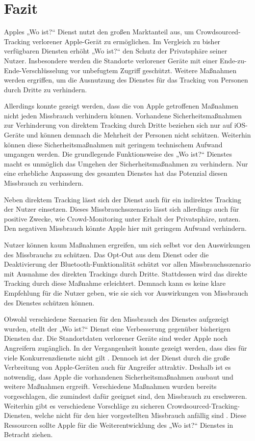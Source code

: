 \section{Fazit}
\label{sec:Fazit}

Apples „Wo ist?“ Dienst nutzt den großen Marktanteil aus, um Crowdsourced-Tracking verlorener Apple-Gerät zu ermöglichen.
Im Vergleich zu bisher verfügbaren Diensten erhöht „Wo ist?“ den Schutz der Privatsphäre seiner Nutzer.
Insbesondere werden die Standorte verlorener Geräte mit einer Ende-zu-Ende-Verschlüsselung vor unbefugtem Zugriff geschützt.
Weitere Maßnahmen werden ergriffen, um die Ausnutzung des Dienstes für das Tracking von Personen durch Dritte zu verhindern.

Allerdings konnte gezeigt werden, dass die von Apple getroffenen Maßnahmen nicht jeden Missbrauch verhindern können.
Vorhandene Sicherheitsmaßnahmen zur Verhinderung von direktem Tracking durch Dritte beziehen sich nur auf iOS-Geräte und können demnach die Mehrheit der Personen nicht schützen.
Weiterhin können diese Sicherheitsmaßnahmen mit geringem technischem Aufwand umgangen werden.
Die grundlegende Funktionsweise des „Wo ist?“ Dienstes macht es unmöglich das Umgehen der Sicherheitsmaßnahmen zu verhindern.
Nur eine erhebliche Anpassung des gesamten Dienstes hat das Potenzial diesen Missbrauch zu verhindern.

Neben direktem Tracking lässt sich der Dienst auch für ein indirektes Tracking der Nutzer einsetzen.
Dieses Missbrauchsszenario lässt sich allerdings auch für positive Zwecke, wie Crowd-Monitoring unter Erhalt der Privatsphäre, nutzen.
Den negativen Missbrauch könnte Apple hier mit geringem Aufwand verhindern.

Nutzer können kaum Maßnahmen ergreifen, um sich selbst vor den Auswirkungen des Missbrauchs zu schützen.
Das Opt-Out aus dem Dienst oder die Deaktivierung der Bluetooth-Funktionalität schützt vor allen Missbrauchsszenario mit Ausnahme des direkten Trackings durch Dritte.
Stattdessen wird das direkte Tracking durch diese Maßnahme erleichtert.
Demnach kann es keine klare Empfehlung für die Nutzer geben, wie sie sich vor Auswirkungen von Missbrauch des Dienstes schützen können.


Obwohl verschiedene Szenarien für den Missbrauch des Dienstes aufgezeigt wurden, stellt der „Wo ist?“ Dienst eine Verbesserung gegenüber bisherigen Diensten dar.
Die Standortdaten verlorener Geräte sind weder Apple noch Angreifern zugänglich.
In der Vergangenheit konnte gezeigt werden, dass dies für viele Konkurrenzdienste nicht gilt \cite{Garg_Secure_Tracker,Weller_BLE_Finders}.
Dennoch ist der Dienst durch die große Verbreitung von Apple-Geräten auch für Angreifer attraktiv.
Deshalb ist es notwendig, dass Apple die vorhandenen Sicherheitsmaßnahmen ausbaut und weitere Maßnahmen ergreift.
Verschiedene Maßnahmen wurden bereits vorgeschlagen, die zumindest dafür geeignet sind, den Missbrauch zu erschweren.
Weiterhin gibt es verschiedene Vorschläge zu sicheren Crowdsourced-Tracking-Diensten, welche nicht für den hier vorgestellten Missbrauch anfällig sind \cite{Garg_Secure_Tracker,Weller_BLE_Finders}.
Diese Ressourcen sollte Apple für die Weiterentwicklung des „Wo ist?“ Dienstes in Betracht ziehen.